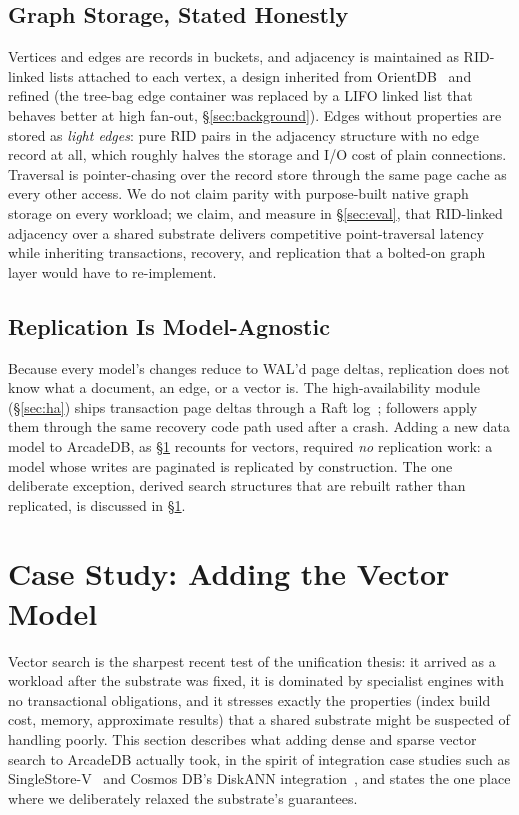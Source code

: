 \documentclass[conference]{IEEEtran}
\newcommand{\arcadedb}{ArcadeDB}
\begin{document}
\subsection{Graph Storage, Stated Honestly}\label{sec:graph}

Vertices and edges are records in buckets, and adjacency is maintained as
RID-linked lists attached to each vertex, a design inherited from
OrientDB~\cite{ritter2021orientdb} and refined (the tree-bag edge container
was replaced by a LIFO linked list that behaves better at high fan-out,
\S\ref{sec:background}). Edges without properties are stored as
\emph{light edges}: pure RID pairs in the adjacency structure with no edge
record at all, which roughly halves the storage and I/O cost of plain
connections. Traversal is pointer-chasing over the record store through the
same page cache as every other access. We do not claim parity with
purpose-built native graph storage on every workload; we claim, and measure in
\S\ref{sec:eval}, that RID-linked adjacency over a shared substrate delivers
competitive point-traversal latency while inheriting transactions, recovery,
and replication that a bolted-on graph layer would have to re-implement.

\subsection{Replication Is Model-Agnostic}\label{sec:replication-arch}

Because every model's changes reduce to WAL'd page deltas, replication does
not know what a document, an edge, or a vector is. The high-availability
module (\S\ref{sec:ha}) ships transaction page deltas through a Raft
log~\cite{ongaro2014raft}; followers apply them through the same recovery
code path used after a crash. Adding a new data model to \arcadedb{}, as
\S\ref{sec:vector} recounts for vectors, required \emph{no} replication work:
a model whose writes are paginated is replicated by construction. The one
deliberate exception, derived search structures that are rebuilt rather than
replicated, is discussed in \S\ref{sec:vector}.

\section{Case Study: Adding the Vector Model}\label{sec:vector}

Vector search is the sharpest recent test of the unification thesis: it
arrived as a workload after the substrate was fixed, it is dominated by
specialist engines with no transactional obligations, and it stresses exactly
the properties (index build cost, memory, approximate results) that a shared
substrate might be suspected of handling poorly. This section describes what
adding dense and sparse vector search to \arcadedb{} actually took, in the
spirit of integration case studies such as
SingleStore-V~\cite{chen2024singlestorev} and Cosmos DB's DiskANN
integration~\cite{upreti2025cosmosvector}, and states the one place where we
deliberately relaxed the substrate's guarantees.
\end{document}

